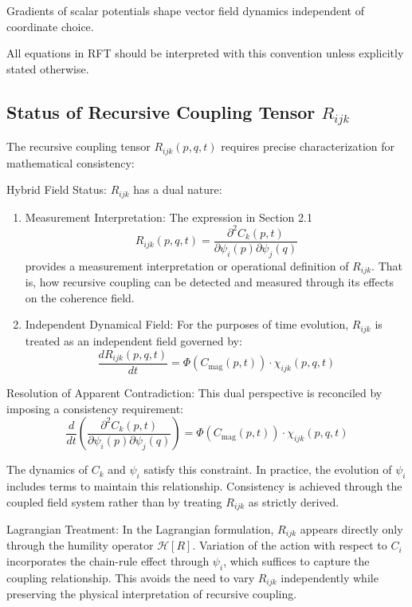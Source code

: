 Gradients of scalar potentials shape vector field dynamics independent of coordinate choice.

All equations in RFT should be interpreted with this convention unless explicitly stated otherwise.

\subsection{Status of Recursive Coupling Tensor \(R_{ijk}\)}

The recursive coupling tensor \(R_{ijk}(p,q,t)\) requires precise characterization for mathematical consistency:

Hybrid Field Status:
\(R_{ijk}\) has a dual nature:
\begin{enumerate}
    \item Measurement Interpretation: The expression in Section 2.1
    \begin{equation}
    R_{ijk}(p, q, t) = \frac{\partial^2 C_k(p,t)}{\partial \psi_i(p) \partial \psi_j(q)}
    \end{equation}
    provides a measurement interpretation or operational definition of \(R_{ijk}\). That is, how recursive coupling can be detected and measured through its effects on the coherence field.
    \item Independent Dynamical Field: For the purposes of time evolution, \(R_{ijk}\) is treated as an independent field governed by:
    \begin{equation}
    \frac{dR_{ijk}(p,q,t)}{dt} = \Phi(C_{\mathrm{mag}}(p,t)) \cdot \chi_{ijk}(p,q,t)
    \end{equation}
\end{enumerate}

Resolution of Apparent Contradiction:
This dual perspective is reconciled by imposing a consistency requirement:
\begin{equation}
\frac{d}{dt}\left(\frac{\partial^2 C_k(p,t)}{\partial \psi_i(p) \partial \psi_j(q)}\right) = \Phi(C_{\mathrm{mag}}(p,t)) \cdot \chi_{ijk}(p,q,t)
\end{equation}

The dynamics of \(C_k\) and \(\psi_i\) satisfy this constraint. In practice, the evolution of \(\psi_i\) includes terms to maintain this relationship. Consistency is achieved through the coupled field system rather than by treating \(R_{ijk}\) as strictly derived.

Lagrangian Treatment:
In the Lagrangian formulation, \(R_{ijk}\) appears directly only through the humility operator \(\mathcal{H}[R]\). Variation of the action with respect to \(C_i\) incorporates the chain-rule effect through \(\psi_i\), which suffices to capture the coupling relationship. This avoids the need to vary \(R_{ijk}\) independently while preserving the physical interpretation of recursive coupling. 
